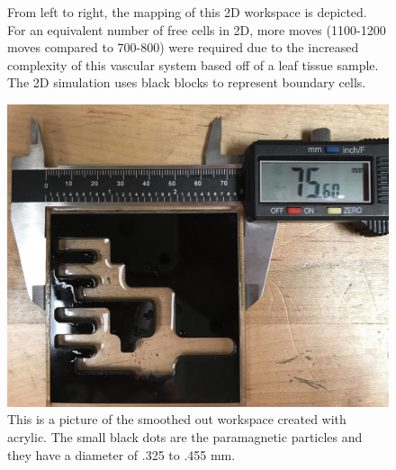 \documentclass[letterpaper, 9 pt, conference]{ieeeconf}  %
\begin{document}
\begin{figure}
	\caption{From left to right, the mapping of this 2D workspace is depicted. For an equivalent number of free cells in 2D, more moves (1100-1200 moves compared to 700-800) were required due to the increased complexity of this vascular system based off of a leaf tissue sample. The 2D simulation uses black blocks to represent boundary cells.}
	\centering
	\includegraphics[height=0.10\paperheight]{Optimized-Workspace.jpg}
\caption{
This is a picture of the smoothed out workspace created with acrylic. The small black dots are the paramagnetic particles and they have a diameter of .325 to .455 mm. 
}
\end{figure}


\end{document}
